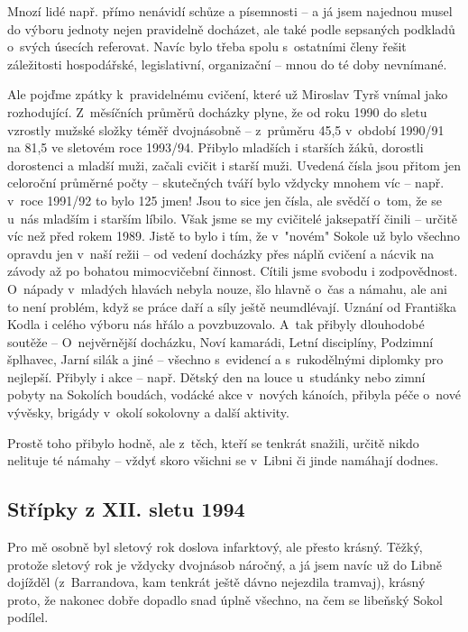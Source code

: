 \documentclass[a5paper, 11pt, twoside]{article}
\begin{document}
Mnozí lidé např. přímo nenávidí schůze a písemnosti -- a já jsem
najednou musel do výboru jednoty nejen pravidelně docházet, ale také
podle sepsaných podkladů o~svých úsecích referovat. Navíc bylo třeba
spolu s~ostatními členy řešit záležitosti hospodářské, legislativní,
organizační -- mnou do té doby nevnímané.

Ale pojďme zpátky k~pravidelnému cvičení, které už Miroslav Tyrš vnímal
jako rozhodující. Z~měsíčních průměrů docházky plyne, že od roku 1990 do
sletu vzrostly mužské složky téměř dvojnásobně -- z~průměru 45,5
v~období 1990/91 na 81,5 ve sletovém roce 1993/94. Přibylo mladších i
starších žáků, dorostli dorostenci a mladší muži, začali cvičit i starší
muži. Uvedená čísla jsou přitom jen celoroční průměrné počty --
skutečných tváří bylo vždycky mnohem víc -- např. v~roce 1991/92 to bylo
125 jmen! Jsou to sice jen čísla, ale svědčí o~tom, že se u~nás mladším
i starším líbilo. Však jsme se my cvičitelé jaksepatří činili -- určitě
víc než před rokem 1989. Jistě to bylo i tím, že v~"novém" Sokole už
bylo všechno opravdu jen v~naší režii -- od vedení docházky přes náplň
cvičení a nácvik na závody až po bohatou mimocvičební činnost. Cítili
jsme svobodu i zodpovědnost. O~nápady v~mladých hlavách nebyla nouze,
šlo hlavně o~čas a námahu, ale ani to není problém, když se práce daří a
síly ještě neumdlévají. Uznání od Františka Kodla i celého výboru nás
hřálo a povzbuzovalo. A~tak přibyly dlouhodobé soutěže -- O~nejvěrnější
docházku, Noví kamarádi, Letní disciplíny, Podzimní šplhavec, Jarní
silák a jiné -- všechno s~evidencí a s~rukodělnými diplomky pro
nejlepší. Přibyly i akce -- např. Dětský den na louce u~studánky nebo
zimní pobyty na Sokolích boudách, vodácké akce v~nových kánoích, přibyla
péče o~nové vývěsky, brigády v~okolí sokolovny a další aktivity.

Prostě toho přibylo hodně, ale z~těch, kteří se tenkrát snažili, určitě
nikdo nelituje té námahy -- vždyť skoro všichni se v~Libni či jinde
namáhají dodnes.

\subsection{Střípky z XII. sletu 1994}

Pro mě osobně byl sletový rok doslova infarktový, ale přesto krásný.
Těžký, protože sletový rok je vždycky dvojnásob náročný, a já jsem navíc
už do Libně dojížděl (z~Barrandova, kam tenkrát ještě dávno nejezdila
tramvaj), krásný proto, že nakonec dobře dopadlo snad úplně všechno, na
čem se libeňský Sokol podílel.
\end{document}
